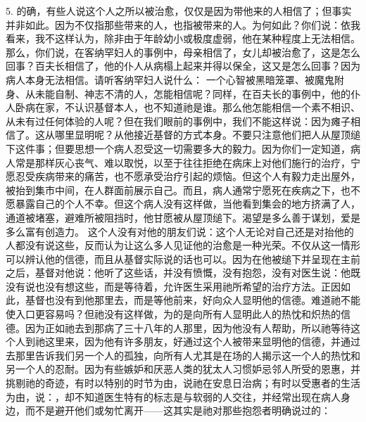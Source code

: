5. 的确，有些人说这个人之所以被治愈，仅仅是因为带他来的人相信了；但事实并非如此。因为不仅指那些带来的人，也指被带来的人。为何如此？你们说：依我看来，我不这样认为，除非由于年龄幼小或极度虚弱，他在某种程度上无法相信。那么，你们说，在客纳罕妇人的事例中，母亲相信了，女儿却被治愈了，这是怎么回事？百夫长相信了，他的仆人从病榻上起来并得以保全，这又是怎么回事？因为病人本身无法相信。请听客纳罕妇人说什么： 一个心智被黑暗笼罩、被魔鬼附身、从未能自制、神志不清的人，怎能相信呢？同样，在百夫长的事例中，他的仆人卧病在家，不认识基督本人，也不知道祂是谁。那么他怎能相信一个素不相识、从未有过任何体验的人呢？但在我们眼前的事例中，我们不能这样说：因为瘫子相信了。这从哪里显明呢？从他接近基督的方式本身。不要只注意他们把人从屋顶缒下这件事；但要思想一个病人忍受这一切需要多大的毅力。因为你们一定知道，病人常是那样灰心丧气、难以取悦，以至于往往拒绝在病床上对他们施行的治疗，宁愿忍受疾病带来的痛苦，也不愿承受治疗引起的烦恼。但这个人有毅力走出屋外，被抬到集市中间，在人群面前展示自己。而且，病人通常宁愿死在疾病之下，也不愿暴露自己的个人不幸。但这个病人没有这样做，当他看到集会的地方挤满了人，通道被堵塞，避难所被阻挡时，他甘愿被从屋顶缒下。渴望是多么善于谋划，爱是多么富有创造力。 这个人没有对他的朋友们说：这个人无论对自己还是对抬他的人都没有说这些，反而认为让这么多人见证他的治愈是一种光荣。不仅从这一情形可以辨认他的信德，而且从基督实际说的话也可以。因为在他被缒下并呈现在主前之后，基督对他说：他听了这些话，并没有愤慨，没有抱怨，没有对医生说：他既没有说也没有想这些，而是等待着，允许医生采用祂所希望的治疗方法。正因如此，基督也没有到他那里去，而是等他前来，好向众人显明他的信德。难道祂不能使入口更容易吗？但祂没有这样做，为的是向所有人显明此人的热忱和炽热的信德。因为正如祂去到那病了三十八年的人那里，因为他没有人帮助，所以祂等待这个人到祂这里来，因为他有许多朋友，好通过这个人被带来显明他的信德，并通过去那里告诉我们另一个人的孤独，向所有人尤其是在场的人揭示这一个人的热忱和另一个人的忍耐。因为有些嫉妒和厌恶人类的犹太人习惯妒忌邻人所受的恩惠，并挑剔祂的奇迹，有时以特别的时节为由，说祂在安息日治病；有时以受惠者的生活为由，说：，却不知道医生特有的标志是与软弱的人交往，并经常出现在病人身边，而不是避开他们或匆忙离开——这其实是祂对那些抱怨者明确说过的： 